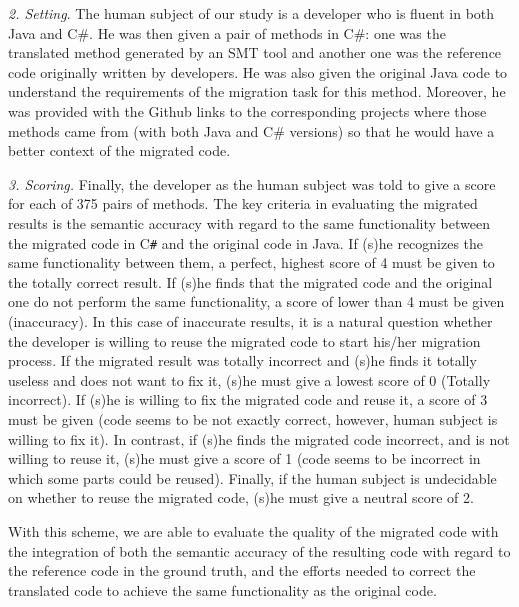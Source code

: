 \emph{2. Setting}. The human subject of our study is a developer who
is fluent in both Java and C\#. He was then given a pair of methods in
C\#: one was the translated method generated by an SMT tool and
another one was the reference code originally written by developers.
He was also given the original Java code to understand the
requirements of the migration task for this method. Moreover, he was
provided with the Github links to the corresponding projects where
those methods came from (with both Java and C\# versions) so that he
would have a better context of the migrated code.

\emph{3. Scoring.} Finally, the developer as the human subject was told
to give a score for each of 375 pairs of methods. The key criteria in
evaluating the migrated results is the semantic accuracy with regard
to the same functionality between the migrated code in C\texttt{\#}
and the original code in Java. If (s)he recognizes the same
functionality between them, a perfect, highest score of 4 must be
given to the totally correct result. If (s)he finds that the migrated
code and the original one do not perform the same functionality, a
score of lower than 4 must be given (inaccuracy). In this case of
inaccurate results,
it is a natural question whether the developer is willing to reuse the
migrated code to start his/her migration process. If the migrated
result was totally incorrect and (s)he finds it totally useless and
does not want to fix it, (s)he must give a lowest score of 0 (Totally
incorrect).
%
If (s)he is willing to fix the migrated code and reuse it, a score of
3 must be given (code seems to be not exactly correct, however, human
subject is willing to fix it). In contrast, if (s)he finds the
migrated code incorrect, and is not willing to reuse it, (s)he must
give a score of 1 (code seems to be incorrect in which some parts
could be reused). Finally, if the human subject is undecidable on
whether to reuse the migrated code, (s)he must give a neutral score of
2.

With this scheme, we are able to evaluate the quality of the migrated
code with the integration of both the semantic accuracy of the
resulting code with regard to the reference code in the ground truth,
and the efforts needed to correct the translated code to achieve the
same functionality as the original code.

